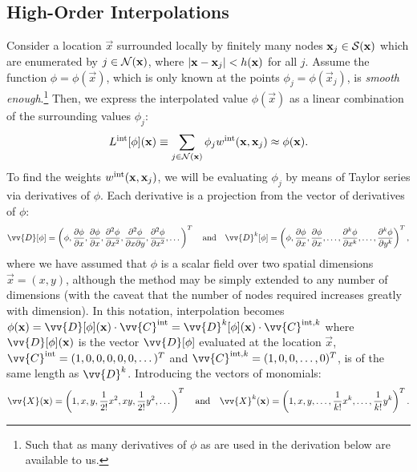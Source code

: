 \subsection{High-Order Interpolations}

Consider a location $\vec{x}$ surrounded locally by finitely many nodes $\vec{x}_j \in \cl{S}(\vec{x})$ which are enumerated by $j \in \cl{N}(\vec{x})$, where $\abs{\vec{x} - \vec{x}_j} < h(\vec{x})$ for all $j$. Assume the function $\phi = \phi(\vec{x})$, which is only known at the points $\phi_j = \phi(\vec{x}_j)$, is \emph{smooth enough}.\footnote{Such that as many derivatives of $\phi$ as are used in the derivation below are available to us.} Then, we express the interpolated value $\phi(\vec{x})$ as a linear combination of the surrounding values $\phi_j$:
\begin{equation} \label{eqn:L}
L^{\rm{int}}[\phi](\vec{x}) \equiv \sum_{j \in \cl{N}(\vec{x})} \phi_j w^{\rm{int}}(\vec{x}, \vec{x}_j) \approx \phi(\vec{x}).
\end{equation}
To find the weights $w^{\rm{int}}(\vec{x}, \vec{x}_j)$, we will be evaluating $\phi_j$ by means of Taylor series via derivatives of $\phi$. Each derivative is a projection from the vector of derivatives of $\phi$:
\begin{equation}
\vv{D}[\phi] = \left(\phi, \pdv{\phi}{x}, \pdv{\phi}{x}, \pdv[2]{\phi}{x}, \pdv[2]{\phi}{x}{y}, \pdv[2]{\phi}{x}, \dots \right)^T
\quad \text{and} \quad
\vv{D}^k[\phi] = \left(\phi, \pdv{\phi}{x}, \pdv{\phi}{x}, \dots, \pdv[k]{\phi}{x}, \dots, \pdv[k]{\phi}{y} \right)^T,
\end{equation}
where we have assumed that $\phi$ is a scalar field over two spatial dimensions $\vec{x}=(x, y)$, although the method may be simply extended to any number of dimensions (with the caveat that the number of nodes required increases greatly with dimension). In this notation, interpolation becomes $\phi(\vec{x}) = \vv{D}[\phi](\vec{x}) \cdot \vv{C}^{\rm{int}} = \vv{D}^k[\phi](\vec{x}) \cdot \vv{C}^{\rm{int}, k}$ where $\vv{D}[\phi](\vec{x})$ is the vector $\vv{D}[\phi]$ evaluated at the location $\vec{x}$, $\vv{C}^{\rm{int}} = (1, 0, 0, 0, 0, 0, \dots)^T$ and $\vv{C}^{\rm{int}, k} = (1, 0, 0, \dots, 0)^T$, is of the same length as $\vv{D}^k$. Introducing the vectors of monomials:
\begin{equation}
\vv{X}(\vec{x}) = \left(1, x, y, \frac{1}{2!} x^2, xy, \frac{1}{2!} y^2, \dots \right)^T
\quad \text{and} \quad
\vv{X}^k(\vec{x}) = \left(1, x, y, \dots, \frac{1}{k!} x^k, \dots, \frac{1}{k!} y^k \right)^T.
\end{equation}

